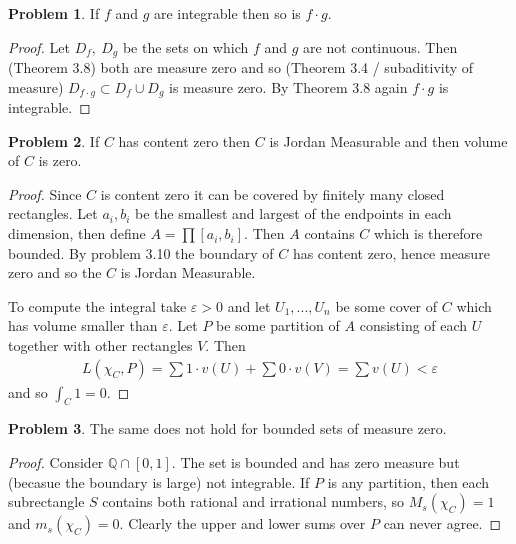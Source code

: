 \documentclass[20pt]{article}
\theoremstyle{plain}
\theoremstyle{definition}
\newtheorem*{problem}{Problem}
\newcommand{\rationals}{\mathbb{Q}}
\begin{document}
\begin{problem}{3.14}
  If $f$ and $g$ are integrable then so is $f\cdot g$.
\end{problem}

\begin{proof}
  Let $D_f,\ D_g$ be the sets on which $f$ and $g$ are not continuous.
  Then (Theorem 3.8) both are measure zero and so (Theorem 3.4 / subaditivity of measure)
  $D_{f\cdot g} \subset D_f \cup D_g$ is measure zero.
  By Theorem 3.8 again $f \cdot g$ is integrable.
\end{proof}


\begin{problem}{3.15}
  If $C$ has content zero then $C$ is Jordan Measurable and
  then volume of $C$ is zero.
\end{problem}

\begin{proof}
  Since $C$ is content zero it can be covered by finitely many closed rectangles.
  Let $a_i, b_i$ be the smallest and largest of the endpoints in each dimension,
  then define $A = \prod [a_i, b_i].$ Then $A$ contains $C$ which is therefore bounded.
  By problem 3.10 the boundary of $C$ has content zero, hence measure zero and so
  the $C$ is Jordan Measurable.

  To compute the integral take $\varepsilon > 0$ and let
  $U_1, ..., U_n$ be some cover of $C$ which has volume smaller than $\varepsilon.$
  Let $P$ be some partition of $A$ consisting
  of each $U$ together with other rectangles $V$.
  Then
  \begin{align*}
    L(\chi_C, P) = \sum 1 \cdot v(U) + \sum 0 \cdot v(V) = \sum v(U) < \varepsilon
  \end{align*}
  and so $\int_C 1 = 0.$

\end{proof}

\begin{problem}{3.16}
  The same does not hold for bounded sets of measure zero.
\end{problem}

\begin{proof}
  Consider $\rationals \cap [0,1].$  The set is bounded and has zero measure but
  (becasue the boundary is large) not integrable.
  If $P$ is any partition, then each subrectangle $S$ contains both rational and
  irrational numbers, so $M_s(\chi_C) = 1$ and $m_s(\chi_C) = 0.$  Clearly the upper and lower
  sums over $P$ can never agree.
\end{proof}
\end{document}
